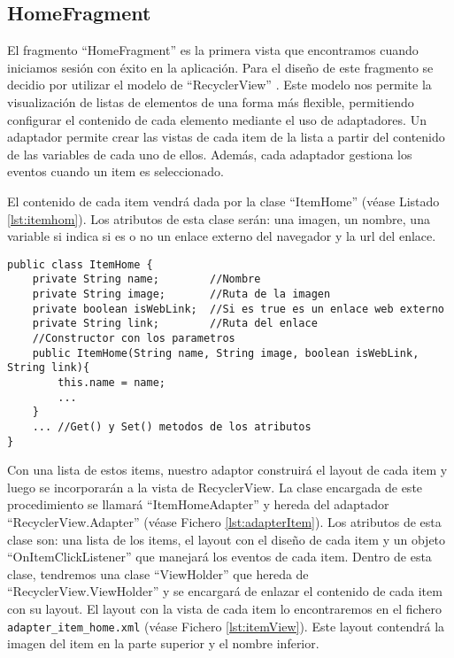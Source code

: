 \subsection{HomeFragment}

El fragmento ``HomeFragment'' es la primera vista que encontramos cuando iniciamos sesión con éxito en la aplicación. Para el diseño de este fragmento se decidio por utilizar el modelo de ``RecyclerView'' \cite{URL::recycler}. Este modelo nos permite la visualización de listas de elementos de una forma más flexible, permitiendo configurar el contenido de cada elemento mediante el uso de adaptadores. Un adaptador permite crear las vistas de cada item de la lista a partir del contenido de las variables de cada uno de ellos. Además, cada adaptador gestiona los eventos cuando un item es seleccionado.

El contenido de cada item vendrá dada por la clase ``ItemHome'' (véase Listado \ref{lst:itemhom}). Los atributos de esta clase serán: una imagen, un nombre, una variable si indica si es o no un enlace externo del navegador y la url del enlace.

\begin{lstlisting}[caption={Fichero \texttt{ItemHome.java}.},  label={lst:itemhom}]
public class ItemHome {
    private String name;        //Nombre
    private String image;       //Ruta de la imagen
    private boolean isWebLink;  //Si es true es un enlace web externo
    private String link;        //Ruta del enlace
    //Constructor con los parametros
    public ItemHome(String name, String image, boolean isWebLink, String link){
        this.name = name;
        ...
    }
    ... //Get() y Set() metodos de los atributos
}
\end{lstlisting}

Con una lista de estos items, nuestro adaptor construirá el layout de cada item y luego se incorporarán a la vista de RecyclerView. La clase encargada de este procedimiento se llamará ``ItemHomeAdapter'' y hereda del adaptador ``RecyclerView.Adapter'' (véase Fichero \ref{lst:adapterItem}). Los atributos de esta clase son: una lista de los items, el layout con el diseño de cada item y un objeto ``OnItemClickListener'' que manejará los eventos de cada item. Dentro de esta clase, tendremos una clase ``ViewHolder'' que hereda de ``RecyclerView.ViewHolder'' y se encargará de enlazar el contenido de cada item con su layout. El layout con la vista de cada item lo encontraremos en el fichero \texttt{adapter\_item\_home.xml} (véase Fichero \ref{lst:itemView}). Este layout contendrá la imagen del item en la parte superior y el nombre inferior.
     
